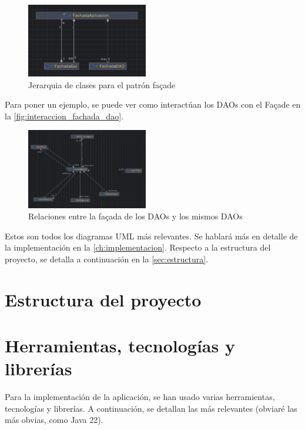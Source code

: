 \begin{figure}
    \centering
    \includegraphics[width=200px]{recursos/diagramas/jerarquia_fachada}
    \caption{Jerarquia de clases para el patrón façade}
    \label{fig:jerarquia_fachada}
\end{figure}

Para poner un ejemplo, se puede ver como interactúan los DAOs con el Façade en la \autoref{fig:interaccion_fachada_dao}.

\begin{figure}
    \centering
    \includegraphics[width=200px]{recursos/diagramas/fdao_dao_rel}
    \caption{Relaciones entre la façada de los DAOs y los mismos DAOs}
    \label{fig:interaccion_fachada_dao}
\end{figure}

Estos son todos los diagramas UML más relevantes.
Se hablará más en detalle de la implementación en la \autoref{ch:implementacion}.
Respecto a la estructura del proyecto, se detalla a continuación en la \autoref{sec:estructura}.
\newpage


\section{Estructura del proyecto}\label{sec:estructura}


\section{Herramientas, tecnologías y librerías}\label{sec:herramientas_tecnologias_y_librerias}
Para la implementación de la aplicación, se han usado varias herramientas, tecnologías y librerías.
A continuación, se detallan las más relevantes (obviaré las más obvias, como Java 22).

